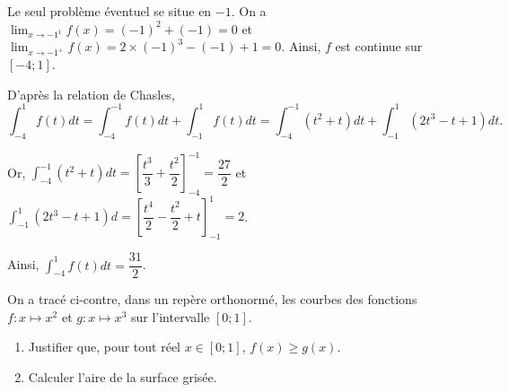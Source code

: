 \documentclass[11pt,fleqn, openany]{book} %
\begin{document}
\begin{solution}

Le seul problème éventuel se situe en \(-1\). On a \(\displaystyle\lim_{x \to -1^1}f(x)=(-1)^2+(-1)=0\) et \\ \(\displaystyle\lim_{x \to -1^+}f(x)=2 \times (-1)^3-(-1)+1=0\). Ainsi, \(f\) est continue sur \([-4;1]\). 

 D'après la relation de Chasles,\[\displaystyle\int_{-4}^1 f(t)dt = \displaystyle\int_{-4}^{-1} f(t)dt+\displaystyle\int_{-1}^1 f(t)dt = \displaystyle\int_{-4}^{-1} (t^2+t)dt
+\displaystyle\int_{-1}^1 (2t^3-t+1)dt .\]

Or, \( \displaystyle\int_{-4}^{-1} (t^2+t)dt = \left[ \dfrac{t^3}{3}+\dfrac{t^2}{2}\right]_{-4}^{-1}=\dfrac{27}{2}\) et \(\displaystyle\int_{-1}^1 (2t^3-t+1)d=\left[\dfrac{t^4}{2}-\dfrac{t^2}{2}+t\right]_{-1}^1=2\).

Ainsi, \(\displaystyle\int_{-4}^1 f(t)dt=\dfrac{31}{2}\).\end{solution} 



\begin{exercise}[topic=int02]
 \begin{minipage}{0.7\linewidth}
 On a tracé ci-contre, dans un repère orthonormé, les courbes des fonctions $f :x\mapsto x^2$ et $g:x \mapsto x^3$ sur l'intervalle $[0;1]$.
\begin{enumerate}
\item Justifier que, pour tout réel $x\in [0;1]$, $f(x)\geqslant g(x)$.
\item Calculer l'aire de la surface grisée.
\end{enumerate}

\end{minipage}\hfill \begin{minipage}{0.25\linewidth}
\end{minipage}
\end{exercise}
\end{document}
